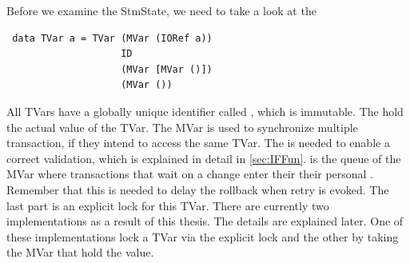 Before we examine the StmState, we need to take a look at the 
\begin{lstlisting}
 data TVar a = TVar (MVar (IORef a))
                    ID
                    (MVar [MVar ()])
                    (MVar ())
\end{lstlisting}
All TVars have a globally unique identifier called , which is immutable. The  
hold the actual value of the TVar. The MVar is used to synchronize multiple transaction, if they intend to 
access the same TVar. The  is needed to enable a correct validation, which is explained in detail
in \ref{sec:IFFun}.  is the queue of the MVar where transactions that wait on a change
enter their their personal . Remember that this is needed to delay the rollback when retry
is evoked. The last part is an explicit lock for this TVar. There are currently two implementations as 
a result of this thesis. The details are explained later. One of these implementations lock a TVar via 
the explicit lock and the other by taking the MVar that hold the value.

